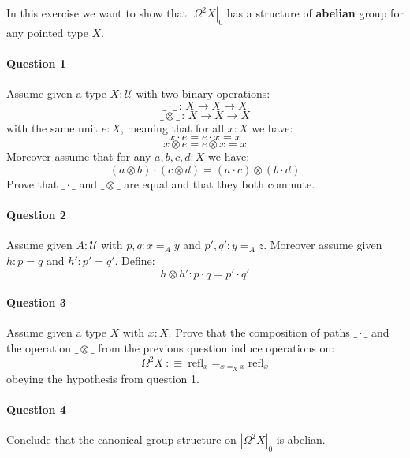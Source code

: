 \documentclass{article}[6pt]%
\newcommand{\U}{{\mathcal U}}
\renewcommand{\r}{\rightarrow}
\newcommand{\refl}{\mathrm{refl}}
\begin{document}
\begin{Exercise}[title={Eckmann-Hilton argument}]
In this exercise we want to show that $|\Omega^2 X|_0$ has a structure of {\bf abelian} group for any pointed type $X$.%

\paragraph{Question 1} Assume given a type $X:\U$ with two binary operations: 
\[\_\cdot\_ \, :\, X\r X\r X\]
\[\_\otimes\_ \, :\,  X\r X\r X\] 
with the same unit $e:X$, meaning that for all $x:X$ we have: 
\[x\cdot e = e\cdot x = x\]
\[x\otimes e = e\otimes x = x\]
Moreover assume that for any $a,b,c,d:X$ we have:
\[(a\otimes b)\cdot(c\otimes d) = (a\cdot c)\otimes(b\cdot d)\]
Prove that $\_\cdot\_$ and $\_\otimes\_$ are equal and that they both commute.


\paragraph{Question 2} Assume given $A:\U$ with $p,q : x=_Ay$ and $p',q':y=_Az$. Moreover assume given $h:p=q$ and $h':p'=q'$. Define:
\[h\otimes h': p\cdot q = p'\cdot q'\]

\paragraph{Question 3} Assume given a type $X$ with $x:X$. Prove that the composition of paths $\_\cdot\_$ and the operation $\_\otimes\_$ from the previous question induce operations on: 
\[\Omega^2 X \ :\equiv\ \refl_x=_{x=_Xx}\refl_x\]
obeying the hypothesis from question 1.

\paragraph{Question 4} Conclude that the canonical group structure on $|\Omega^2 X|_0$ is abelian.

\end{Exercise}
\end{document}
